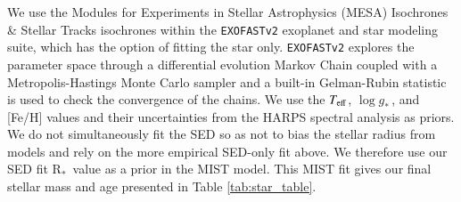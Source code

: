\documentclass{aa}
\newcommand{\feh}{\mbox{[Fe/H]}\xspace}
\newcommand{\teff}{\ensuremath{T_{\rm eff}}\xspace}
\newcommand{\logg}{\mbox{$\log g_*$}\,}
\newcommand{\rstar}{\mbox{R$_{*}$}}
\newcommand{\exofast}{{\sc \tt EXOFASTv2}\xspace}
\begin{document}
We use the Modules for Experiments in Stellar Astrophysics (MESA) Isochrones \& Stellar Tracks \citep[MIST;][]{Choi2016,Dotter2016} isochrones within the \exofast \citep{Eastman2013,Eastman2017,Eastman2019} exoplanet and star modeling suite, which has the option of fitting the star only. \exofast explores the parameter space through a differential evolution Markov Chain coupled with a Metropolis-Hastings Monte Carlo sampler and a built-in Gelman-Rubin statistic \citep{GelmanRubin1992,Gelman2003,Ford2006} is used to check the convergence of the chains. We use the \teff, \logg, and \feh values and their uncertainties from the HARPS spectral analysis as priors. We do not simultaneously fit the SED so as not to bias the stellar radius from models and rely on the more empirical SED-only fit above. We therefore use our SED fit \rstar\, value as a prior in the MIST model. This MIST fit gives our final stellar mass and age presented in Table \ref{tab:star_table}.
\end{document}

